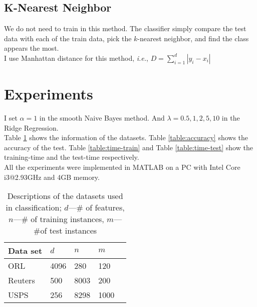 \documentclass[8pt]{article}
\def\abovespace{\abovestrut{0.20in}}
\def\belowspace{\belowstrut{0.10in}}
\def\abovestrut#1{\rule[0in]{0in}{#1}\ignorespaces}
\def\belowstrut#1{\rule[-#1]{0in}{#1}\ignorespaces}
\begin{document}
\subsection{K-Nearest Neighbor}
We do not need to train in this method.
The classifier simply compare the test data with each of the train data,
pick the $k$-nearest neighbor, and find the class appears the most.\\
I use Manhattan distance for this method,
\textit{i.e.}, $D=\sum\limits_{i=1}^d|y_i-x_i|$

\section{Experiments}
I set $\alpha=1$ in the smooth Naive Bayes method.
And $\lambda=0.5,1,2,5,10$ in the Ridge Regression. \\
Table \ref{table:datasets} shows the information of the datasets.
Table \ref{table:accuracy} shows the accuracy of the test.
Table \ref{table:time-train} and Table \ref{table:time-test}
show the training-time and the test-time respectively.\\
All the experiments were implemented in MATLAB on a PC
with Intel Core i3@2.93GHz and 4GB memory.
\begin{table}[t]
\caption{Descriptions of the datasets used in classification;
$d$---\# of features, $n$---\# of training instances, $m$---\#of test instances}
\label{table:datasets}
\begin{center}
\begin{small}
\begin{sc}
\begin{tabular}{p{2.5cm}p{1.5cm}p{1.5cm}lr}
\hline
\abovespace\belowspace
Data set& $d$ & $n$ & $m$ \\
\hline
\abovespace
ORL & 4096& 280& 120&  \\
Reuters  & 500& 8003& 200& \\
\belowspace
USPS & 256& 8298& 1000&\\
\hline
\end{tabular}
\end{sc}
\end{small}
\end{center}
\end{table}
\end{document}
